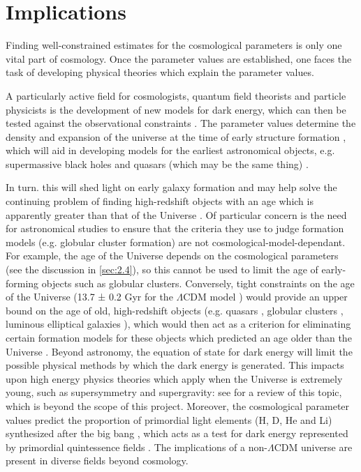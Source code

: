 





\section{Implications}
\label{sec:5.4}

Finding well-constrained estimates for the cosmological parameters is only one vital part of cosmology. Once the parameter values are established, one faces the task of developing physical theories which explain the parameter values. 

A particularly active field for cosmologists, quantum field theorists and particle physicists is the development of new models for dark energy, which can then be tested against the observational constraints \cite{LinderScherrer2009,Copeland2006}. The parameter values determine the density and expansion of the universe at the time of early structure formation \cite{Rees1998,Riess2009}, which will aid in developing models for the earliest astronomical objects, e.g. supermassive black holes and quasars (which may be the same thing) \cite{Rees1998}. 

In turn. this will shed light on early galaxy formation and may help solve the continuing problem of finding high-redshift objects with an age which is apparently greater than that of the Universe \cite{Krauss1997,Dunlop1996}.  Of particular concern is the need for astronomical studies to ensure that the criteria they use to judge formation models (e.g. globular cluster formation) are not cosmological-model-dependant. For example, the age of the Universe depends on the cosmological parameters (see the discussion in \cref{sec:2.4}), so this cannot be used to limit the age of early-forming objects such as globular clusters. Conversely, tight constraints on the age of the Universe (13.7 ± 0.2 Gyr for the $\Lambda$CDM model \cite{Barnes2005}) would provide an upper bound on the age of old, high-redshift objects (e.g. quasars \cite{Hasinger2002}, globular clusters \cite{Reid1998}, luminous elliptical galaxies \cite{Dunlop1996}), which would then act as a criterion for eliminating certain formation models for these objects which predicted an age older than the Universe \cite{Dunlop1996}. Beyond astronomy, the equation of state for dark energy will limit the possible physical methods by which the dark energy is generated. This impacts upon high energy physics theories which apply when the Universe is extremely young, such as supersymmetry and supergravity: see \cite{Copeland2006} for a review of this topic, which is beyond the scope of this project. Moreover, the cosmological parameter values predict the proportion of primordial light elements (H, D, He and Li) synthesized after the big bang \cite{Riess2009}, which acts as a test for dark energy represented by primordial quintessence fields \cite{Copeland2006}. The implications of a non-$\Lambda$CDM universe are present in diverse fields beyond cosmology.

